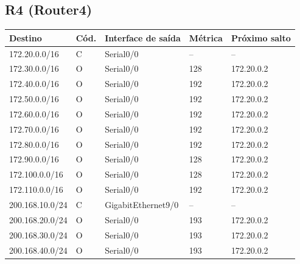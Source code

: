 \subsection*{R4 (Router4)}
\begin{tabular}{@{}llllp{3.6cm}@{}}\toprule Destino & Cód. & Interface de saída & Métrica & Próximo salto\\\midrule
172.20.0.0/16 & C & Serial0/0 & -- & --\\
172.30.0.0/16 & O & Serial0/0 & 128 & 172.20.0.2\\
172.40.0.0/16 & O & Serial0/0 & 192 & 172.20.0.2\\
172.50.0.0/16 & O & Serial0/0 & 192 & 172.20.0.2\\
172.60.0.0/16 & O & Serial0/0 & 192 & 172.20.0.2\\
172.70.0.0/16 & O & Serial0/0 & 192 & 172.20.0.2\\
172.80.0.0/16 & O & Serial0/0 & 192 & 172.20.0.2\\
172.90.0.0/16 & O & Serial0/0 & 128 & 172.20.0.2\\
172.100.0.0/16 & O & Serial0/0 & 128 & 172.20.0.2\\
172.110.0.0/16 & O & Serial0/0 & 192 & 172.20.0.2\\
200.168.10.0/24 & C & GigabitEthernet9/0 & -- & --\\
200.168.20.0/24 & O & Serial0/0 & 193 & 172.20.0.2\\
200.168.30.0/24 & O & Serial0/0 & 193 & 172.20.0.2\\
200.168.40.0/24 & O & Serial0/0 & 193 & 172.20.0.2\\
\bottomrule\end{tabular}

